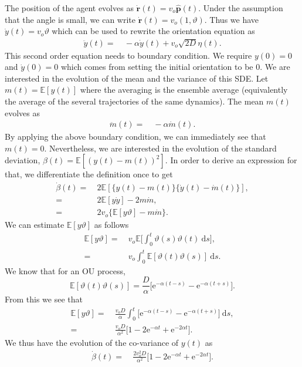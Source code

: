 \documentclass[12pt]{article}
\def\d{\text{d}}
\def\e{\text{e}}
\def\r{\mathbf{r}}
\def\E{\mathbb{E}}
\def\ph{\hat{\mathbf{p}}}
\def\yd{\dot{y}}
\def\theta{\vartheta}
\begin{document}
The position of the agent evolves as $\dot{\r}(t) = v_o \ph(t)$. Under the assumption that the angle
is small, we can write $\dot{\r}(t) = v_o (1, \theta)$. Thus we have $\yd (t) = v_o \theta$ which can
be used to rewrite the orientation equation as
\begin{align}
    \ddot{y}(t) =& \ - \alpha \yd (t) + v_o\sqrt{2 D} \eta(t).
\end{align}
This second order equation needs to boundary condition. We require $y(0) = 0$ and $\yd (0) = 0$ which
comes from setting the initial orientation to be 0. We are interested in the evolution of the mean and
the variance of this SDE. Let $m(t)= \E [  y(t) ]$ where the averaging is the ensemble average
(equivalently the average of the several trajectories of the same dynamics). The mean $m(t)$ evolves as
\begin{align}
    \ddot{m}(t) =& \ -\alpha \dot{m}(t).
\end{align}
By applying the above boundary condition, we can immediately see that $m(t) = 0$. Nevertheless, we are
interested in the evolution of the standard deviation, $\beta(t) = \E [  {(y(t) - m(t))}^2 ]$.
In order to derive an expression for that, we differentiate the definition once to get
\begin{align*}
    \dot{\beta}(t) =& \ 2 \E [ \{ y(t) - m(t) \} \{ \yd(t) - \dot{m}(t) \} ], \\
    = & \ 2 \E [ y \yd ] - 2 m \dot{m}, \\
    = & \ 2 v_o \{ \E [ y \theta ] - m \dot{m}\}.
\end{align*}
We can estimate $\E [ y \theta ]$ as follows
\begin{align*}
    \E [ y \theta ] =& \ v_o \E \bigg[ \int_0^t \theta(s) \theta(t) \ \d s \bigg], \\
    =& \ v_o  \int_0^t \E [ \theta(t) \theta(s) ] \ \d s.
\end{align*}
We know that for an OU process, 
\[
    \E [ \theta(t) \theta(s) ] = \frac{D}{\alpha} \bigg[ \e^{-\alpha(t-s)}-\e^{-\alpha(t+s)} \bigg].
\]
From this we see that
\begin{align*}
    \E [ y \theta ] =& \ \frac{v_o D}{\alpha} \int_0^t  \bigg[ \e^{-\alpha(t-s)}-\e^{-\alpha(t+s)} \bigg] \ \d s, \\
    =& \ \frac{v_o D}{\alpha^2} \bigg[ 1 - 2 \e^{-\alpha t} + \e^{-2 \alpha t}\bigg].
\end{align*}
We thus have the evolution of the co-variance of $y(t)$ as
\begin{align}
    \dot{\beta}(t) = & \  \frac{2 v_o^2 D}{\alpha^2} \bigg[ 1 - 2 \e^{-\alpha t} + \e^{-2 \alpha t}\bigg].
\end{align}
\end{document}
